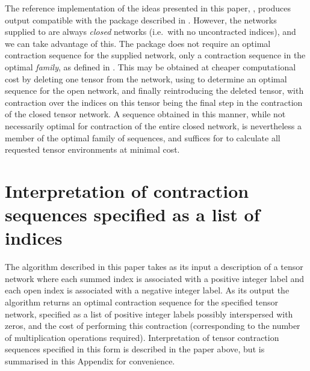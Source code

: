 The reference implementation of the ideas presented in this paper, , produces output compatible with the  package described in . However, the networks supplied to  are always \emph{closed} networks (i.e.~with no uncontracted indices), and we can take advantage of this. The  package does not require an optimal contraction sequence for the supplied network, only a contraction sequence in the optimal \emph{family}, as defined in . This may be obtained at cheaper computational cost by deleting one tensor from the network, using  to determine an optimal sequence for the open network, and finally reintroducing the deleted tensor, with contraction over the indices on this tensor being the final step in the contraction of the closed tensor network. A sequence obtained in this manner, while not necessarily optimal for contraction of the entire closed network, is nevertheless a member of the optimal family of sequences, and suffices for  to calculate all requested tensor environments at minimal cost.

\section{Interpretation of contraction sequences specified as a list of indices\label{sec:readingsequence}}

The  algorithm described in this paper takes as its input a description of a tensor network where each summed index is associated with a positive integer label and each open index is associated with a negative integer label. As its output the algorithm returns an optimal contraction sequence for the specified tensor network, specified as a list of
positive integer labels possibly interspersed with zeros,
and the cost of performing this contraction (corresponding to the number of multiplication operations required). 
Interpretation of tensor contraction sequences specified in this form is described in the paper above, but is summarised in this Appendix for convenience.

